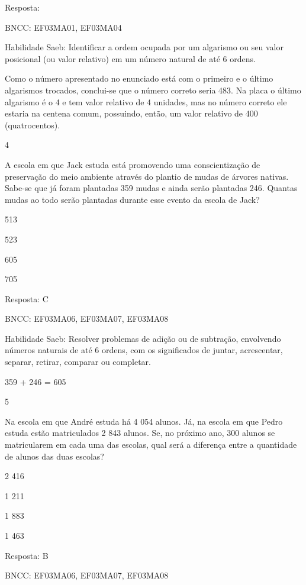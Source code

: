\begin{escolha}
{\begin{escolha}
{Resposta:

BNCC: EF03MA01, EF03MA04

Habilidade Saeb: Identificar a ordem ocupada por um algarismo ou seu
valor posicional (ou valor relativo) em um número natural de até 6
ordens.

Como o número apresentado no enunciado está com o primeiro e o último
algarismos trocados, conclui-se que o número correto seria 483. Na placa
o último algarismo é o 4 e tem valor relativo de 4 unidades, mas no
número correto ele estaria na centena comum, possuindo, então, um valor
relativo de 400 (quatrocentos).

\num{4}

A escola em que Jack estuda está promovendo uma conscientização de
preservação do meio ambiente através do plantio de mudas de árvores
nativas. Sabe-se que já foram plantadas 359 mudas e ainda serão
plantadas 246. Quantas mudas ao todo serão plantadas durante esse evento
da escola de Jack?

\begin{escolha}
\item
  513
\item
  523
\item
  605
\item
  705
\end{escolha}

Resposta: C

BNCC: EF03MA06, EF03MA07, EF03MA08

Habilidade Saeb: Resolver problemas de adição ou de subtração,
envolvendo números naturais de até 6 ordens, com os significados de
juntar, acrescentar, separar, retirar, comparar ou completar.

359 + 246 = 605

\num{5}

Na escola em que André estuda há 4 054 alunos. Já, na escola em que
Pedro estuda estão matriculados 2 843 alunos. Se, no próximo ano, 300
alunos se matricularem em cada uma das escolas, qual será a diferença
entre a quantidade de alunos das duas escolas?

\begin{escolha}
\item
  2 416
\item
  1 211
\item
  1 883
\item
  1 463
\end{escolha}

Resposta: B

BNCC: EF03MA06, EF03MA07, EF03MA08

}
\end{escolha}}
\end{escolha}
